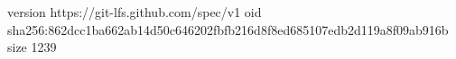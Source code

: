 version https://git-lfs.github.com/spec/v1
oid sha256:862dcc1ba662ab14d50c646202fbfb216d8f8ed685107edb2d119a8f09ab916b
size 1239
